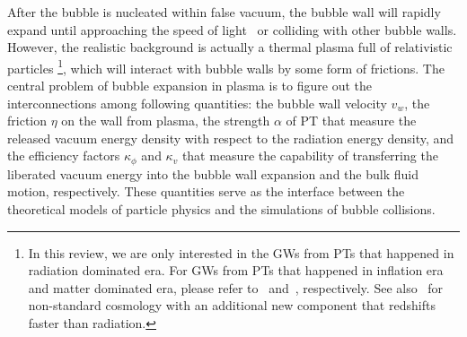 \documentclass[a4paper,11pt]{article}
\begin{document}
After the bubble is nucleated within false vacuum, the bubble wall will rapidly expand until approaching the speed of light~\cite{Coleman:1977py} or colliding with other bubble walls. However, the realistic background is actually a thermal plasma full of relativistic particles \footnote{In this review, we are only interested in the GWs from PTs that happened in radiation dominated era. For GWs from PTs that happened in inflation era and matter dominated era, please refer to~\cite{Baccigalupi:1997re,Chialva:2010jt,Jiang:2015qor} and~\cite{Barenboim:2016mjm}, respectively. See also~\cite{Artymowski:2016tme} for non-standard cosmology with an additional new component that redshifts faster than radiation.}, which will interact with bubble walls by some form of frictions. The central problem of bubble expansion in plasma is to figure out the interconnections among following quantities: the bubble wall velocity $v_w$, the friction $\eta$ on the wall from plasma, the strength $\alpha$ of PT that measure the released vacuum energy density with respect to the radiation energy density, and the efficiency factors $\kappa_\phi$ and $\kappa_v$ that measure the capability of transferring the liberated vacuum energy into the bubble wall expansion and the bulk fluid motion, respectively. These quantities serve as the interface between the theoretical models of particle physics and the simulations of bubble collisions.
\end{document}
